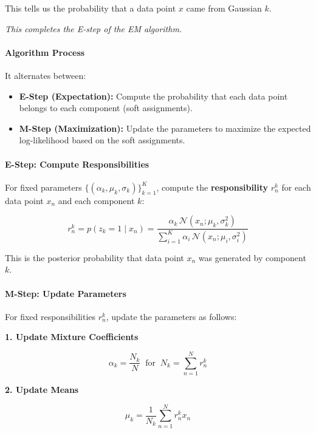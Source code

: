 \documentclass[11pt]{article}
\begin{document}
This tells us the probability that a data point $x$ came from Gaussian $k$.

\bigskip

\noindent\textit{This completes the E-step of the EM algorithm.}

\paragraph*{Algorithm Process}

It alternates between:

\begin{itemize}
	\item \textbf{E-Step (Expectation):} Compute the probability that each data point belongs to each component (soft assignments).
	\item \textbf{M-Step (Maximization):} Update the parameters to maximize the expected log-likelihood based on the soft assignments.
\end{itemize}

\paragraph*{E-Step: Compute Responsibilities}

For fixed parameters $\{(\alpha_k, \mu_k, \sigma_k)\}_{k=1}^{K}$, compute the \textbf{responsibility} $r_n^k$ for each data point $x_n$ and each component $k$:

\[
	r_n^k = p(z_k = 1 \mid x_n)
	= \frac{ \alpha_k \, \mathcal{N}(x_n; \mu_k, \sigma_k^2) }
	{ \sum\limits_{i=1}^{K} \alpha_i \, \mathcal{N}(x_n; \mu_i, \sigma_i^2) }
\]

This is the posterior probability that data point $x_n$ was generated by component $k$.

\pagebreak

\paragraph*{M-Step: Update Parameters}

For fixed responsibilities $r_n^k$, update the parameters as follows:

\medskip

\textbf{1. Update Mixture Coefficients}

\[
	\alpha_k = \frac{N_k}{N}
	\; \; \text{for} \; \;
	N_k = \sum_{n=1}^{N} r_n^k
\]

\textbf{2. Update Means}

\[
	\mu_k = \frac{1}{N_k} \sum_{n=1}^{N} r_n^k x_n
\]
\end{document}
